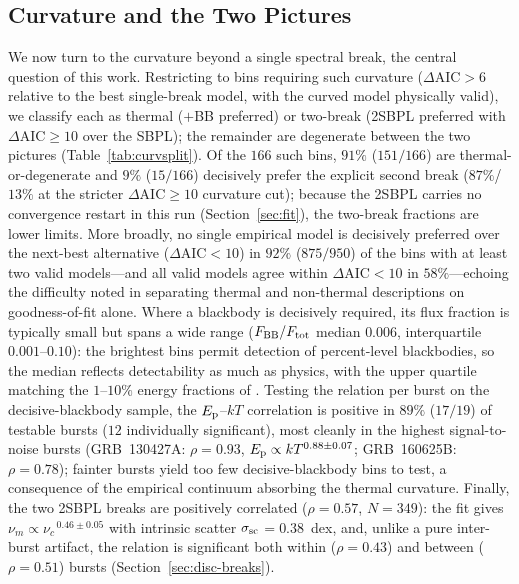 \documentclass[twocolumn]{aastex631}
\newcommand{\nuc}{\ensuremath{\nu_c}}
\newcommand{\num}{\ensuremath{\nu_m}}
\newcommand{\Ep}{\ensuremath{E_{\rm p}}}
\newcommand{\kT}{\ensuremath{kT}}
\newcommand{\daic}{\ensuremath{\Delta\mathrm{AIC}}}
\newcommand{\ssc}{\ensuremath{\sigma_{\rm sc}}}
\begin{document}
\subsection{Curvature and the Two Pictures} \label{sec:curv}
We now turn to the curvature beyond a single spectral break, the central question
of this work. Restricting to bins requiring such curvature ($\daic>6$ relative to
the best single-break model, with the curved model physically valid), we classify
each as thermal ($+$BB preferred) or two-break (2SBPL preferred with
$\daic\ge10$ over the SBPL); the remainder are degenerate between the two
pictures (Table~\ref{tab:curvsplit}). Of the $166$ such bins, $91\%$
($151/166$) are thermal-or-degenerate and $9\%$ ($15/166$) decisively prefer
the explicit second break ($87\%$/$13\%$ at the stricter $\daic\ge10$
curvature cut); because the 2SBPL carries no convergence restart in this run
(Section~\ref{sec:fit}), the two-break fractions are lower limits. More
broadly, no single empirical model is decisively preferred over the next-best
alternative ($\daic<10$) in $92\%$ ($875/950$) of the bins with at least two
valid models---and all valid models agree within $\daic<10$ in $58\%$---echoing
the difficulty \citet{Basak2014} noted in separating thermal and non-thermal
descriptions on goodness-of-fit alone. Where a blackbody is decisively
required, its flux fraction is typically small but spans a wide range
($F_{\rm BB}/F_{\rm tot}$ median $0.006$, interquartile $0.001$--$0.10$): the
brightest bins permit detection of percent-level blackbodies, so the median
reflects detectability as much as physics, with the upper quartile matching the
$1$--$10\%$ energy fractions of \citet{Guiriec2015}. Testing the
\citet{Burgess2014a} relation per burst on the decisive-blackbody sample, the
$\Ep$--$\kT$ correlation is positive in $89\%$ ($17/19$) of testable bursts
($12$ individually significant), most cleanly in the highest signal-to-noise
bursts (GRB~130427A: $\rho=0.93$, $\Ep\propto\kT^{0.88\pm0.07}$;
GRB~160625B: $\rho=0.78$); fainter bursts yield too few decisive-blackbody bins
to test, a consequence of the empirical continuum absorbing the thermal
curvature. Finally, the two 2SBPL breaks are positively correlated
($\rho=0.57$, $N=349$): the \citet{DAgostini2005} fit gives
$\num\propto\nuc^{\,0.46\pm0.05}$ with intrinsic scatter \ssc$=0.38$~dex, and,
unlike a pure inter-burst artifact, the relation is significant both within
($\rho=0.43$) and between ($\rho=0.51$) bursts (Section~\ref{sec:disc-breaks}).
\end{document}
